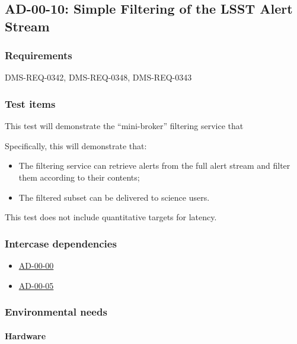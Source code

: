 \subsection{AD-00-10: Simple Filtering of the LSST Alert Stream}
\label{ad-00-10}

\subsubsection{Requirements}

DMS-REQ-0342, DMS-REQ-0348, DMS-REQ-0343

\subsubsection{Test items}
\label{ag-00-10-items}

This test will demonstrate the ``mini-broker'' filtering service that 

Specifically, this will demonstrate that:

\begin{itemize}

	\item{The filtering service can retrieve alerts from the full alert stream and filter them according to their contents;}
	\item{The filtered subset can be delivered to science users.}

\end{itemize}

This test does not include quantitative targets for latency.

\subsubsection{Intercase dependencies}

\begin{itemize}

  \item{\hyperref[ad-00-00]{AD-00-00}}
  \item{\hyperref[ad-00-05]{AD-00-05}}

\end{itemize}

\subsubsection{Environmental needs}

\paragraph{Hardware}

